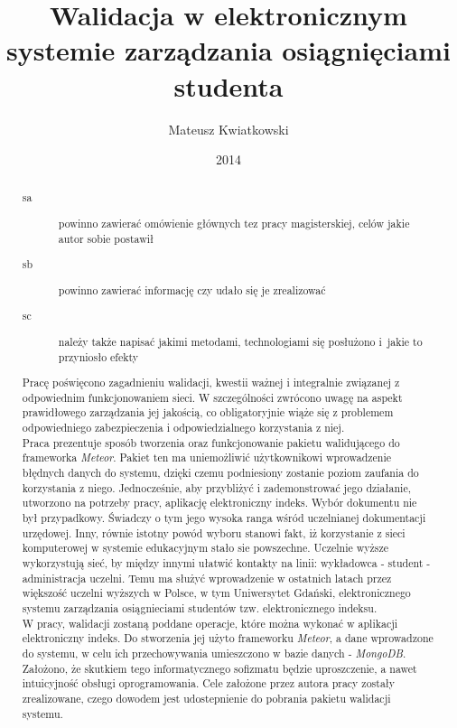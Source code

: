 \documentclass[brudnopis]{xmgr}
\author   {Mateusz Kwiatkowski}
\title    {Walidacja w elektronicznym systemie zarządzania osiągnięciami studenta}
\date     {2014}
\begin{document}
\begin{abstract}

\begin{description}
\item[sa] \textcolor{sa}{powinno zawierać omówienie głównych 
tez pracy magisterskiej, celów jakie autor sobie postawił} 
\item[sb] \textcolor{sb}{powinno zawierać informację czy udało 
  się je zrealizować}
\item[sc] \textcolor{sc}{należy także napisać jakimi metodami,
  technologiami się posłużono i~jakie to przyniosło efekty}
\end{description}

\indent \indent \textcolor{sa}{Pracę poświęcono zagadnieniu walidacji, kwestii ważnej i integralnie związanej z odpowiednim funkcjonowaniem sieci.
W szczególności zwrócono uwagę na aspekt prawidłowego zarządzania jej jakością, co obligatoryjnie wiąże się z problemem
odpowiedniego zabezpieczenia i odpowiedzialnego korzystania z niej.}
\\
\indent \textcolor{sa}{Praca prezentuje sposób tworzenia oraz funkcjonowanie pakietu walidującego do frameworka \textit{Meteor}. Pakiet ten
ma uniemożliwić użytkownikowi wprowadzenie błędnych danych do systemu, dzięki czemu podniesiony zostanie poziom zaufania
do korzystania z niego. Jednocześnie, aby przybliżyć i zademonstrować jego działanie, utworzono na potrzeby pracy, aplikację elektroniczny indeks.
Wybór dokumentu nie był przypadkowy. Świadczy o tym jego wysoka ranga wśród uczelnianej dokumentacji urzędowej. Inny, równie istotny powód
wyboru stanowi fakt, iż korzystanie z sieci komputerowej w systemie edukacyjnym stało sie powszechne. Uczelnie wyższe wykorzystują sieć, by
między innymi ułatwić kontakty na linii: wykładowca - student - administracja uczelni.  Temu ma służyć wprowadzenie w ostatnich latach przez
większość uczelni wyższych w Polsce, w tym Uniwersytet Gdański, elektronicznego systemu zarządzania osiągnieciami studentów
tzw. elektronicznego indeksu.}
\\
\indent \textcolor{sc}{W pracy, walidacji zostaną poddane operacje, które można wykonać w aplikacji elektroniczny indeks. Do stworzenia jej użyto frameworku \textit{Meteor}, a dane wprowadzone do systemu, w celu ich przechowywania umieszczono w bazie danych - \textit{MongoDB}.}
\\
\indent \textcolor{sb}{Założono, że skutkiem tego informatycznego sofizmatu będzie uproszczenie, a nawet intuicyjność obsługi oprogramowania. Cele założone przez autora pracy zostały zrealizowane, czego dowodem jest udostepnienie do pobrania pakietu walidacji systemu.}

\end{abstract}
\end{document}
